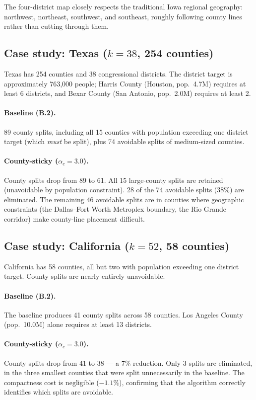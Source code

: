 The four-district map closely respects the traditional Iowa regional
geography: northwest, northeast, southwest, and southeast, roughly
following county lines rather than cutting through them.

\subsection{Case study: Texas ($k{=}38$, 254 counties)}

Texas has 254 counties and 38 congressional districts.  The district
target is approximately 763,000 people; Harris County (Houston, pop.\
4.7M) requires at least 6 districts, and Bexar County (San Antonio,
pop.\ 2.0M) requires at least 2.

\paragraph{Baseline (B.2).}
89 county splits, including all 15 counties with population exceeding
one district target (which \emph{must} be split), plus 74 avoidable splits
of medium-sized counties.

\paragraph{County-sticky ($\alpha_c = 3.0$).}
County splits drop from 89 to 61.  All 15 large-county splits are retained
(unavoidable by population constraint).  28 of the 74 avoidable splits
(38\%) are eliminated.  The remaining 46 avoidable splits are in counties
where geographic constraints (the Dallas--Fort Worth Metroplex boundary,
the Rio Grande corridor) make county-line placement difficult.

\subsection{Case study: California ($k{=}52$, 58 counties)}

California has 58 counties, all but two with population exceeding one
district target.  County splits are nearly entirely unavoidable.

\paragraph{Baseline (B.2).}
The baseline produces 41 county splits across 58 counties.  Los Angeles
County (pop.\ 10.0M) alone requires at least 13 districts.

\paragraph{County-sticky ($\alpha_c = 3.0$).}
County splits drop from 41 to 38 --- a 7\% reduction.  Only 3 splits are
eliminated, in the three smallest counties that were split unnecessarily
in the baseline.  The compactness cost is negligible ($-1.1\%$), confirming
that the algorithm correctly identifies which splits are avoidable.
